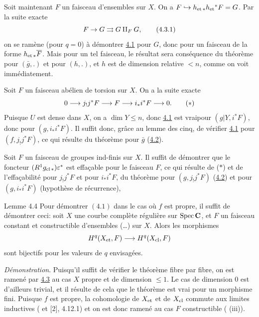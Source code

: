 \documentclass[10pt]{../fichiers-configuration-latex/smfart}
\begin{document}
Soit maintenant $F$ un faisceau d'ensembles sur $X$. On a
$F\hookrightarrow h_{\text{\rm et\,}\ast}h_{\et}{}^{\ast}F=G$. Par la suite exacte
\begin{equation*}
F\rightarrow G\rightrightarrows G\amalg_F G{\quoi},\tag{4.3.1}
\end{equation*}
on se ramène (pour $q=0$) à démontrer \hyperref[XVI.thm4.1]{4.1} pour $G$, donc pour un
faisceau de la forme $h_{\text{\rm et\,}\ast}\bar{F}$. Mais pour un
tel faisceau, le résultat sera conséquence du théorème pour
$(\bar{g},.)$ et pour $(h,.)$, et $h$ est de dimension relative $<n$,
comme on voit immédiatement.

Soit $F$ un faisceau abélien de torsion sur $X$. On a la suite exacte
\begin{equation*}
0\longrightarrow j_{!}j^{\ast}F\longrightarrow F\longrightarrow
i_{\ast}i^{\ast}F\longrightarrow 0{\quoi}.\tag{$\ast$}
\end{equation*}
Puisque $U$ est dense dans $X$, on a $\dim Y\leq n$, donc \hyperref[XVI.thm4.1]{4.1} est 
vrai\pageoriginale pour $(g|Y, i^{\ast}F)$, donc pour
$(g,i_{\ast}i^{\ast}F)$. Il suffit donc, grâce au lemme des cinq, de
vérifier \hyperref[XVI.thm4.1]{4.1} pour $(f,j_{!}j^{\ast}F)$, ce qui résulte du théorème
pour $\bar{g}$ (\hyperref[XVI.lem4.2]{4.2}).

Soit $F$ un faisceau de groupes ind-finis sur $X$. Il suffit de
démontrer que le foncteur $(R^{1}g_{\cl\ast})\epsilon^{\ast}$ est
effaçable pour le faisceau $F$, ce qui résulte de ($\ast$) et de
l'effaçabilité pour $j_{!}j^{\ast}F$ et pour $i_{\ast}i^{\ast}F$,
\ie du théorème pour $(g,j_{!}j^{\ast}F)$ (\hyperref[XVI.lem4.2]{4.2}) et pour
$(g,i_{\ast}i^{\ast}F)$ (hypothèse de récurrence), \cqfd

\begin{enonce*}{Lemme 4.4}
Pour démontrer $(4.1)$ dans le cas où $f$ est propre, il suffit de
démontrer ceci: soit $X$ une courbe complète régulière sur $\Spec
\CC$, et $F$ un faisceau constant et constructible d'ensembles
(\resp\ldots) sur $X$. Alors les morphismes
$$
H^{q}(X_{\et},F)\longrightarrow H^{q}(X_{\cl},F)
$$
sont bijectifs pour les valeurs de $q$ envisagées.
\end{enonce*}

\noindent
\emph{Démonstration}. Puisqu'il suffit de vérifier le théorème fibre
par fibre, on est ramené par \hyperref[XVI.lem4.3]{4.3} au cas $X$ propre et de dimension
$\leq 1$. Le cas de dimension $0$ est d'ailleurs trivial, et il
résulte de cela que le théorème est vrai pour un morphisme
fini. Puisque $f$ est propre, la cohomologie de $X_{\et}$ et
de $X_{\cl}$ commute aux limites inductives (
et [2], 4.12.1) et on est donc ramené au cas $F$ constructible ( (iii)).
\end{document}
